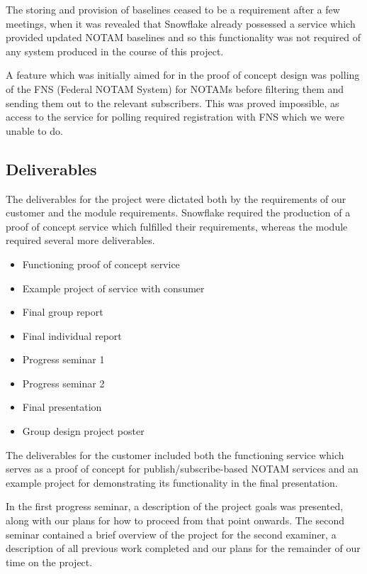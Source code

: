 \documentclass[a4paper, 12pt, twoside]{article}
\begin{document}
The storing and provision of baselines ceased to be a requirement after a few meetings, when it was revealed that Snowflake already possessed a service which provided updated NOTAM baselines and so this functionality was not required of any system produced in the course of this project.

A feature which was initially aimed for in the proof of concept design was polling of the FNS (Federal NOTAM System) for NOTAMs before filtering them and sending them out to the relevant subscribers. This was proved impossible, as access to the service for polling required registration with FNS which we were unable to do.

\subsection{Deliverables}
\label{sec:plan_deliverables}

The deliverables for the project were dictated both by the requirements of our customer and the module requirements. Snowflake required the production of a proof of concept service which fulfilled their requirements, whereas the module required several more deliverables.

\begin{itemize}
\item Functioning proof of concept service
\item Example project of service with consumer
\item Final group report
\item Final individual report
\item Progress seminar 1
\item Progress seminar 2
\item Final presentation
\item Group design project poster
\end{itemize}

The deliverables for the customer included both the functioning service which serves as a proof of concept for publish/subscribe-based NOTAM services and an example project for demonstrating its functionality in the final presentation.

In the first progress seminar, a description of the project goals was presented, along with our plans for how to proceed from that point onwards. The second seminar contained a brief overview of the project for the second examiner, a description of all previous work completed and our plans for the remainder of our time on the project.
\end{document}
